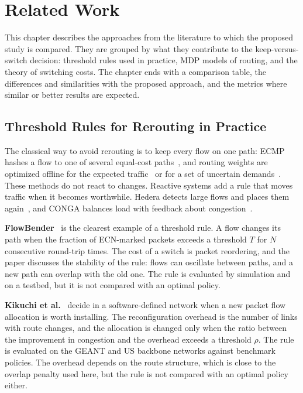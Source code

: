 \documentclass[11pt,a4paper]{article}
\begin{document}
\setcounter{section}{1}
\section{Related Work}

This chapter describes the approaches from the literature to which the proposed study is compared. They are grouped by what they contribute to the keep-versus-switch decision: threshold rules used in practice, MDP models of routing, and the theory of switching costs. The chapter ends with a comparison table, the differences and similarities with the proposed approach, and the metrics where similar or better results are expected.

\subsection{Threshold Rules for Rerouting in Practice}

The classical way to avoid rerouting is to keep every flow on one path: ECMP hashes a flow to one of several equal-cost paths~\cite{hopps2000}, and routing weights are optimized offline for the expected traffic~\cite{fortz2000} or for a set of uncertain demands~\cite{applegate2003}. These methods do not react to changes. Reactive systems add a rule that moves traffic when it becomes worthwhile. Hedera detects large flows and places them again~\cite{alfares2010}, and CONGA balances load with feedback about congestion~\cite{alizadeh2014}.

\textbf{FlowBender}~\cite{kabbani2014} is the clearest example of a threshold rule. A flow changes its path when the fraction of ECN-marked packets exceeds a threshold $T$ for $N$ consecutive round-trip times. The cost of a switch is packet reordering, and the paper discusses the stability of the rule: flows can oscillate between paths, and a new path can overlap with the old one. The rule is evaluated by simulation and on a testbed, but it is not compared with an optimal policy.

\textbf{Kikuchi et al.}~\cite{kikuchi2025} decide in a software-defined network when a new packet flow allocation is worth installing. The reconfiguration overhead is the number of links with route changes, and the allocation is changed only when the ratio between the improvement in congestion and the overhead exceeds a threshold $\rho$. The rule is evaluated on the GEANT and US backbone networks against benchmark policies. The overhead depends on the route structure, which is close to the overlap penalty used here, but the rule is not compared with an optimal policy either.
\end{document}
